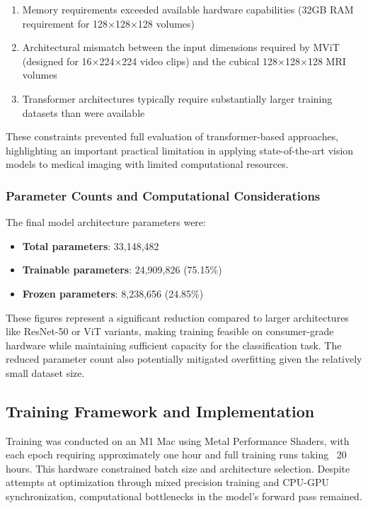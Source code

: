 \documentclass[12pt, a4paper]{article}
\begin{document}
\begin{enumerate}
      \begin{enumerate}
        \item Memory requirements exceeded available hardware capabilities (32GB RAM requirement for 128×128×128 volumes)
        \item Architectural mismatch between the input dimensions required by MViT (designed for 16×224×224 video clips) and the cubical 128×128×128 MRI volumes
        \item Transformer architectures typically require substantially larger training datasets than were available
      \end{enumerate}
      
      These constraints prevented full evaluation of transformer-based approaches, highlighting an important practical limitation in applying state-of-the-art vision models to medical imaging with limited computational resources.
\end{enumerate}

\subsubsection{Parameter Counts and Computational Considerations}

The final model architecture parameters were:

\begin{itemize}
    \item \textbf{Total parameters}: 33,148,482
    \item \textbf{Trainable parameters}: 24,909,826 (75.15\%)
    \item \textbf{Frozen parameters}: 8,238,656 (24.85\%)
\end{itemize}

These figures represent a significant reduction compared to larger architectures like ResNet-50 or ViT variants, making training feasible on consumer-grade hardware while maintaining sufficient capacity for the classification task. The reduced parameter count also potentially mitigated overfitting given the relatively small dataset size.

\subsection{Training Framework and Implementation}

Training was conducted on an M1 Mac using Metal Performance Shaders, with each epoch requiring approximately one hour and full training runs taking ~20 hours. This hardware constrained batch size and architecture selection. Despite attempts at optimization through mixed precision training and CPU-GPU synchronization, computational bottlenecks in the model's forward pass remained.
\end{document}
